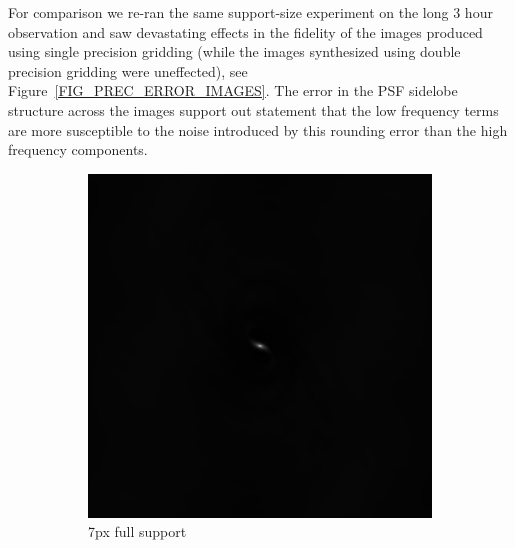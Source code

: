 For comparison we re-ran the same support-size experiment on the long 3 hour observation and saw devastating effects in the fidelity of the images produced using single precision gridding (while the images synthesized using double precision
gridding were uneffected), see Figure~\ref{FIG_PREC_ERROR_IMAGES}. The error in the PSF sidelobe structure across the images support out statement that the low frequency terms are more susceptible to the noise introduced by this rounding
error than the high frequency components.
\begin{figure}[ht!]
 \begin{mdframed} \centering
    \begin{subfigure}[b]{0.45\textwidth}\centering
      \includegraphics[width=\textwidth]{images/180min_single_7.png}
      \caption{7px full support}
    \end{subfigure}
    \begin{subfigure}[b]{0.45\textwidth}\centering

\end{subfigure}
\end{mdframed}
\end{figure}
